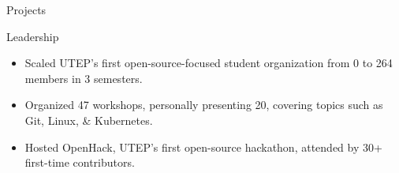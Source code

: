 \documentclass{resume} %
\begin{document}
\begin{workSection}{Projects}
\end{workSection}

\begin{workSection}{Leadership}
    
    \customItem[
			title=President \& Founder - \href{https://www.instagram.com/foss.utep/}{{FOSS Club} },
			duration=December 2023 - March 2025
    ]
    \begin{itemize}
			\vspace{-0.5em}
			\itemsep -6pt {}
			\item Scaled UTEP's first open-source-focused student organization from {0 to 264 members in 3 semesters}. %
			\item Organized {47 workshops, personally presenting 20}, covering topics such as Git, Linux, \& Kubernetes.
			\item Hosted OpenHack, UTEP's {first open-source hackathon}, attended by {30+ first-time contributors}.
    \end{itemize}


\end{workSection}
\end{document}
